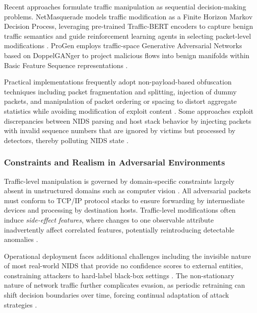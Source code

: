 Recent approaches formulate traffic manipulation as sequential decision-making problems. NetMasquerade models traffic modification as a Finite Horizon Markov Decision Process, leveraging pre-trained Traffic-BERT encoders to capture benign traffic semantics and guide reinforcement learning agents in selecting packet-level modifications \cite{liu2025hard}. ProGen employs traffic-space Generative Adversarial Networks based on DoppelGANger to project malicious flows into benign manifolds within Basic Feature Sequence representations \cite{wang2024progen}.

Practical implementations frequently adopt non-payload-based obfuscation techniques including packet fragmentation and splitting, injection of dummy packets, and manipulation of packet ordering or spacing to distort aggregate statistics while avoiding modification of exploit content \cite{vitorino2023sok}. Some approaches exploit discrepancies between NIDS parsing and host stack behavior by injecting packets with invalid sequence numbers that are ignored by victims but processed by detectors, thereby polluting NIDS state \cite{hashemi2020enhancing}.

\subsubsection{Constraints and Realism in Adversarial Environments}

Traffic-level manipulation is governed by domain-specific constraints largely absent in unstructured domains such as computer vision \cite{vitorino2023sok}. All adversarial packets must conform to TCP/IP protocol stacks to ensure forwarding by intermediate devices and processing by destination hosts. Traffic-level modifications often induce \emph{side-effect features}, where changes to one observable attribute inadvertently affect correlated features, potentially reintroducing detectable anomalies \cite{vitorino2023sok}.

Operational deployment faces additional challenges including the invisible nature of most real-world NIDS that provide no confidence scores to external entities, constraining attackers to hard-label black-box settings \cite{vitorino2023sok}. The non-stationary nature of network traffic further complicates evasion, as periodic retraining can shift decision boundaries over time, forcing continual adaptation of attack strategies \cite{apruzzese2024adversarial}.




